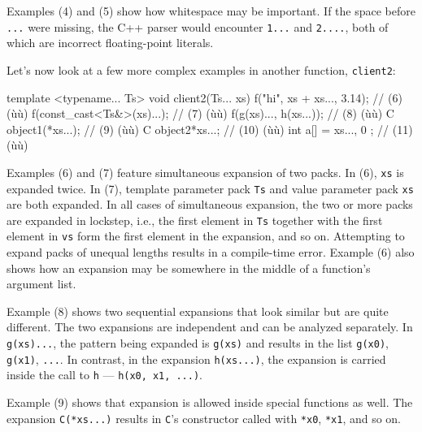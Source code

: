 Examples (4) and (5) show how whitespace may be important. If the space
before \lstinline!...! were missing, the C++ parser would encounter
\lstinline!1...! and \lstinline!2....!, both of which are incorrect
floating-point literals.

Let's now look at a few more complex examples in another function,
\lstinline!client2!:

\begin{emcppslisting}[emcppsbatch=e27]
template <typename... Ts>
void client2(Ts... xs)
{
    f("hi", xs + xs..., 3.14);  // (6) (ù{}ù)
    f(const_cast<Ts&>(xs)...);  // (7) (ù{}ù)
    f(g(xs)..., h(xs...));      // (8) (ù{}ù)
    C object1(*xs...);          // (9) (ù{}ù)
    C object2{*xs...};          // (10) (ù{}ù)
    int a[] = { xs..., 0 };     // (11) (ù{}ù)
}
\end{emcppslisting}
    

\noindent Examples (6) and (7) feature simultaneous expansion of two packs. In
(6), \lstinline!xs! is expanded twice. In (7), template parameter pack
\lstinline!Ts! and value parameter pack \lstinline!xs! are both expanded. In
all cases of simultaneous expansion, the two or more packs are expanded
in lockstep, i.e., the first element in \lstinline!Ts! together with the
first element in \lstinline!vs! form the first element in the expansion,
and so on. Attempting to expand packs of unequal lengths results in a
compile-time error. Example (6) also shows how an expansion may be
somewhere in the middle of a function's argument list.

Example (8) shows two sequential expansions that look similar but are
quite different. The two expansions are independent and can be analyzed
separately. In \lstinline!g(xs)...!, the pattern being expanded is
\lstinline!g(xs)! and results in the list \lstinline!g(x0)!, \lstinline!g(x1)!,
\lstinline!...!. In contrast, in the expansion \lstinline!h(xs...)!, the
expansion is carried inside the call to \lstinline!h! ---
\lstinline!h(x0,!~\lstinline!x1,!~\lstinline!...)!.

Example (9) shows that expansion is allowed inside special functions as
well. The expansion \lstinline!C(*xs...)! results in \lstinline!C!'s
constructor called with \lstinline!*x0!, \lstinline!*x1!, and so on.

